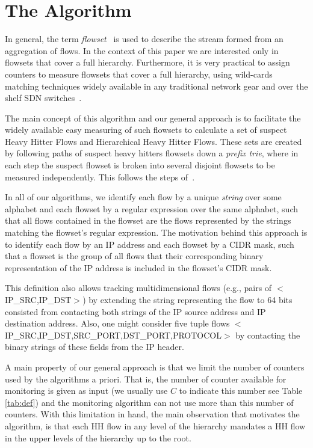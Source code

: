 \section{The \simpleAlgo Algorithm}

In general, the term \textit{flowset}~\cite{conf/sigcomm/YuanCM07} is used to describe the stream formed from an aggregation of flows.
In the context of this paper
we are interested only in flowsets that cover a full hierarchy.
Furthermore, it is very practical to assign counters to measure flowsets that cover a full hierarchy, using wild-cards matching techniques widely available in any traditional network gear and over the shelf SDN switches~\cite{OVS, OF1.5}.



The main concept of this algorithm and our general approach is to facilitate the widely available easy measuring of such flowsets to calculate a set of suspect Heavy Hitter Flows and Hierarchical Heavy Hitter Flows. These sets are created by following paths of suspect heavy hitters flowsets down a \textit{prefix trie}, where in each step the suspect flowset is broken into several disjoint flowsets to be measured independently. This follows the steps of~\cite{conf/sigcomm/YuanCM07,Moraney2016, moraney2018}.

In all of our algorithms, we identify each flow by a unique \textit{string} over some alphabet and each flowset by a regular expression over the same alphabet, such that all flows contained in the flowset are the flows represented by the strings matching the flowset's regular expression. The motivation behind this approach is to identify each flow by an IP address and each flowset by a CIDR mask, such that a flowset is the group of all flows that their corresponding binary representation of the IP address is included in the flowset's CIDR mask.

This definition also allows tracking multidimensional flows (e.g., pairs of $<$IP\_SRC,IP\_DST$>$) by extending the string representing the flow to 64 bits consisted from contacting both strings of the IP source address and IP destination address. Also, one might consider five tuple flows $<$IP\_SRC,IP\_DST,SRC\_PORT,DST\_PORT,PROTOCOL$>$ by contacting the binary strings of these fields from the IP header.

A main property of our general approach is that we limit the number of counters used by the algorithms a priori. That is, the number of counter available for monitoring is given as input (we usually use $C$ to indicate this number see Table \ref{tab:def}) and the monitoring algorithm can not use  more than this number of counters.
With this limitation in hand, the main observation that motivates the algorithm, is that each HH flow in any level of the hierarchy mandates a HH flow in the upper levels of the hierarchy up to the root.

